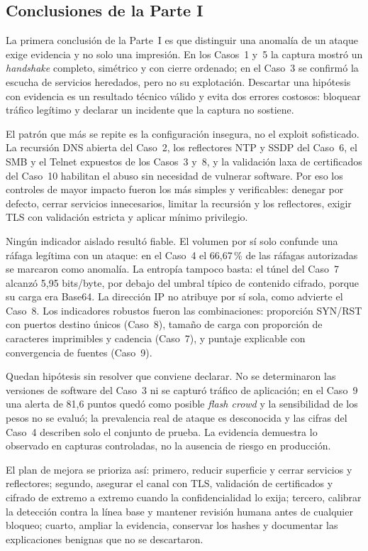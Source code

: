 \subsection{Conclusiones de la Parte I}

La primera conclusión de la Parte~I es que distinguir una anomalía de un ataque exige evidencia y no solo una impresión. En los Casos~1 y~5 la captura mostró un \emph{handshake} completo, simétrico y con cierre ordenado; en el Caso~3 se confirmó la escucha de servicios heredados, pero no su explotación. Descartar una hipótesis con evidencia es un resultado técnico válido y evita dos errores costosos: bloquear tráfico legítimo y declarar un incidente que la captura no sostiene.

El patrón que más se repite es la configuración insegura, no el exploit sofisticado. La recursión DNS abierta del Caso~2, los reflectores NTP y SSDP del Caso~6, el SMB y el Telnet expuestos de los Casos~3 y~8, y la validación laxa de certificados del Caso~10 habilitan el abuso sin necesidad de vulnerar software. Por eso los controles de mayor impacto fueron los más simples y verificables: denegar por defecto, cerrar servicios innecesarios, limitar la recursión y los reflectores, exigir TLS con validación estricta y aplicar mínimo privilegio.

Ningún indicador aislado resultó fiable. El volumen por sí solo confunde una ráfaga legítima con un ataque: en el Caso~4 el 66,67\,\% de las ráfagas autorizadas se marcaron como anomalía. La entropía tampoco basta: el túnel del Caso~7 alcanzó 5,95 bits/byte, por debajo del umbral típico de contenido cifrado, porque su carga era Base64. La dirección IP no atribuye por sí sola, como advierte el Caso~8. Los indicadores robustos fueron las combinaciones: proporción SYN/RST con puertos destino únicos (Caso~8), tamaño de carga con proporción de caracteres imprimibles y cadencia (Caso~7), y puntaje explicable con convergencia de fuentes (Caso~9).

Quedan hipótesis sin resolver que conviene declarar. No se determinaron las versiones de software del Caso~3 ni se capturó tráfico de aplicación; en el Caso~9 una alerta de 81,6 puntos quedó como posible \emph{flash crowd} y la sensibilidad de los pesos no se evaluó; la prevalencia real de ataque es desconocida y las cifras del Caso~4 describen solo el conjunto de prueba. La evidencia demuestra lo observado en capturas controladas, no la ausencia de riesgo en producción.

El plan de mejora se prioriza así: primero, reducir superficie y cerrar servicios y reflectores; segundo, asegurar el canal con TLS, validación de certificados y cifrado de extremo a extremo cuando la confidencialidad lo exija; tercero, calibrar la detección contra la línea base y mantener revisión humana antes de cualquier bloqueo; cuarto, ampliar la evidencia, conservar los hashes y documentar las explicaciones benignas que no se descartaron.

